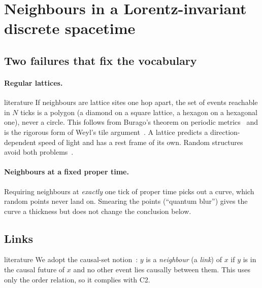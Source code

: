 \documentclass[11pt,a4paper]{article}
\newcommand{\tagbox}[2]{\textsf{\scriptsize\colorbox{#1!12}{\textcolor{#1!70!black}{#2}}}}
\newcommand{\lit}{\tagbox{blue}{literature}}
\begin{document}
\section{Neighbours in a Lorentz-invariant discrete spacetime}
\subsection{Two failures that fix the vocabulary}
\paragraph{Regular lattices.} \lit{} If neighbours are lattice sites one hop apart, the set of events reachable in $N$ ticks is a polygon (a diamond on a square lattice, a hexagon on a hexagonal one), never a circle. This follows from Burago's theorem on periodic metrics~\cite{Burago} and is the rigorous form of Weyl's tile argument~\cite{Weyl}. A lattice predicts a direction-dependent speed of light and has a rest frame of its own. Random structures avoid both problems~\cite{VahidiAslWierman}.
\paragraph{Neighbours at a fixed proper time.} Requiring neighbours at \emph{exactly} one tick of proper time picks out a curve, which random points never land on. Smearing the points (``quantum blur'') gives the curve a thickness but does not change the conclusion below.

\subsection{Links}
\lit{} We adopt the causal-set notion~\cite{BLMS87,Surya19}: $y$ is a \emph{neighbour} (a \emph{link}) of $x$ if $y$ is in the causal future of $x$ and no other event lies causally between them. This uses only the order relation, so it complies with C2.
\end{document}
